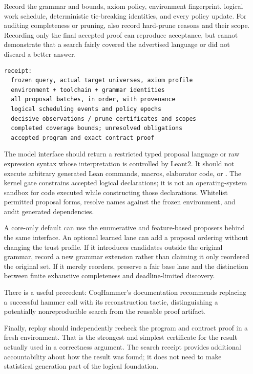 \documentclass[11pt,a4paper]{article}
\newcommand{\code}[1]{\texttt{\detokenize{#1}}}
\theoremstyle{definition}
\theoremstyle{remark}
\begin{document}
Record the grammar and bounds, axiom policy, environment fingerprint, logical work schedule, deterministic tie-breaking identities, and every policy update. For auditing completeness or pruning, also record hard-prune reasons and their scope. Recording only the final accepted proof can reproduce acceptance, but cannot demonstrate that a search fairly covered the advertised language or did not discard a better answer.

\par\noindent\begin{minipage}{\linewidth}
\begin{lstlisting}
receipt:
  frozen query, actual target universes, axiom profile
  environment + toolchain + grammar identities
  all proposal batches, in order, with provenance
  logical scheduling events and policy epochs
  decisive observations / prune certificates and scopes
  completed coverage bounds; unresolved obligations
  accepted program and exact contract proof
\end{lstlisting}
\end{minipage}\par

The model interface should return a restricted typed proposal language or raw expression syntax whose interpretation is controlled by Leant2. It should not execute arbitrary generated Lean commands, macros, elaborator code, or \code{IO}. The kernel gate constrains accepted logical declarations; it is not an operating-system sandbox for code executed while constructing those declarations. Whitelist permitted proposal forms, resolve names against the frozen environment, and audit generated dependencies.

A core-only default can use the enumerative and feature-based proposers behind the same interface. An optional learned lane can add a proposal ordering without changing the trust profile. If it introduces candidates outside the original grammar, record a new grammar extension rather than claiming it only reordered the original set. If it merely reorders, preserve a fair base lane and the distinction between finite exhaustive completeness and deadline-limited discovery.

There is a useful precedent: CoqHammer's documentation recommends replacing a successful hammer call with its reconstruction tactic, distinguishing a potentially nonreproducible search from the reusable proof artifact.\cite{sauto-docs}

Finally, replay should independently recheck the program and contract proof in a fresh environment. That is the strongest and simplest certificate for the result actually used in a correctness argument. The search receipt provides additional accountability about how the result was found; it does not need to make statistical generation part of the logical foundation.
\end{document}

